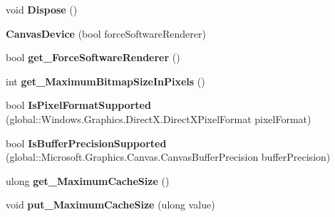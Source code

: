 \begin{DoxyCompactItemize}
\mbox{\label{class_microsoft_1_1_graphics_1_1_canvas_1_1_canvas_device_a9613f1f6bab02464823bd1e9d55c8374}} 
void {\bfseries Dispose} ()
\item 
\mbox{\label{class_microsoft_1_1_graphics_1_1_canvas_1_1_canvas_device_a92581b24422598de5948e89c9ba6eb53}} 
{\bfseries Canvas\+Device} (bool force\+Software\+Renderer)
\item 
\mbox{\label{class_microsoft_1_1_graphics_1_1_canvas_1_1_canvas_device_a0583e03d53b172ea1a1220e1df5b2616}} 
bool {\bfseries get\+\_\+\+Force\+Software\+Renderer} ()
\item 
\mbox{\label{class_microsoft_1_1_graphics_1_1_canvas_1_1_canvas_device_af71c8661ed6a571c7678dfcd97de7bc8}} 
int {\bfseries get\+\_\+\+Maximum\+Bitmap\+Size\+In\+Pixels} ()
\item 
\mbox{\label{class_microsoft_1_1_graphics_1_1_canvas_1_1_canvas_device_a01381b0e199054ee3d65ce1d6916972f}} 
bool {\bfseries Is\+Pixel\+Format\+Supported} (global\+::\+Windows.\+Graphics.\+Direct\+X.\+Direct\+X\+Pixel\+Format pixel\+Format)
\item 
\mbox{\label{class_microsoft_1_1_graphics_1_1_canvas_1_1_canvas_device_a05ed962d04bfea58842bb028fe6b8c4e}} 
bool {\bfseries Is\+Buffer\+Precision\+Supported} (global\+::\+Microsoft.\+Graphics.\+Canvas.\+Canvas\+Buffer\+Precision buffer\+Precision)
\item 
\mbox{\label{class_microsoft_1_1_graphics_1_1_canvas_1_1_canvas_device_a5f095678b43b4ace5f118aa2556deffe}} 
ulong {\bfseries get\+\_\+\+Maximum\+Cache\+Size} ()
\item 
\mbox{\label{class_microsoft_1_1_graphics_1_1_canvas_1_1_canvas_device_a87716d3ac1ed253fcee0a5e307d24b50}} 
void {\bfseries put\+\_\+\+Maximum\+Cache\+Size} (ulong value)

\end{DoxyCompactItemize}
